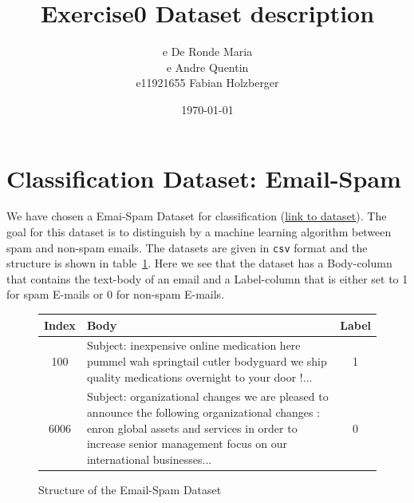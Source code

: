 \documentclass[11pt]{article}
\title{Exercise0 Dataset description}
\author{e De Ronde Maria \\ e Andre Quentin  \\ e11921655 Fabian Holzberger }
\date{\today}
\begin{document}
\graphicspath{{./figures/}}
\maketitle
\section{Classification Dataset: Email-Spam}
We have chosen a Emai-Spam Dataset for classification (\href{https://www.kaggle.com/nitishabharathi/email-spam-dataset?select=enronSpamSubset.csv}{link to dataset}). The goal for this dataset is to distinguish by a machine learning algorithm between  spam and non-spam emails. The datasets are given in \texttt{csv} format and the structure is shown in table~\ref{tab::0}. Here we see that the dataset has a Body-column that contains the text-body of an email and a Label-column that is either set to 1 for spam E-mails or 0 for non-spam E-mails. 

\begin{figure}[h]
  \begin{tabular}{ | c | p{13cm} | c |}
    \hline
    Index & Body & Label \\
    \hline
    100 & 
    Subject: inexpensive online medication here
 pummel wah springtail cutler bodyguard
 we ship quality medications overnight to your door !...
    & 1 \\ \hline
    6006
    &
    Subject: organizational changes
 we are pleased to announce the following organizational changes :
 enron global assets and services
 in order to increase senior management focus on our international businesses... 
    & 0 \\
    \hline
    \end{tabular}
    \caption{Structure of the Email-Spam Dataset}
    \label{tab::0}
  \end{figure}
\end{document}
